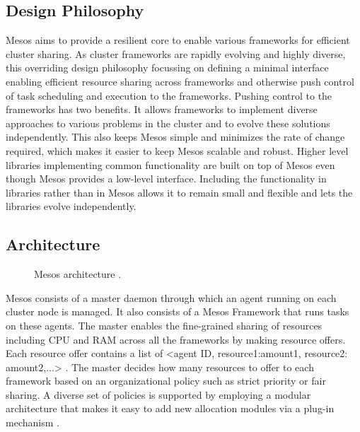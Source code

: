 \documentclass[9pt,twocolumn,twoside]{../../styles/osajnl}
\begin{document}
\subsection{Design Philosophy}
Mesos aims to provide a resilient core to enable various frameworks
for efficient cluster sharing. As cluster frameworks are rapidly
evolving and highly diverse, this overriding design philosophy
focussing on defining a minimal interface enabling efficient
resource sharing across frameworks and otherwise push control of task
scheduling and execution to the frameworks. Pushing control to the
frameworks has two benefits. It allows frameworks to implement diverse
approaches to various problems in the cluster and to evolve these
solutions independently. This also keeps Mesos simple and minimizes
the rate of change required, which makes it easier to keep Mesos
scalable and robust. Higher level libraries implementing common
functionality are built on top of Mesos even though Mesos provides a
low-level interface. Including the functionality in libraries rather
than in Mesos allows it to remain small and flexible and lets the
libraries evolve independently.

\subsection{Architecture}

\begin{figure}[htbp]
\centering
{}
\caption{Mesos architecture \cite{www-mesos-arch}.}
\label{fig:false-color}
\end{figure}

Mesos consists of a master daemon through which an agent running on
each cluster node is managed. It also consists of a Mesos Framework
that runs tasks on these agents.  The master enables the fine-grained
sharing of resources including CPU and RAM across all the frameworks
by making resource offers. Each resource offer contains a list of
<agent ID, resource1:amount1, resource2: amount2,...>
\cite{www-mesos-arch}. The master decides how many resources to offer
to each framework based on an organizational policy such as strict
priority or fair sharing. A diverse set of policies is supported by
employing a modular architecture that makes it easy to add new
allocation modules via a plug-in mechanism \cite{www-mesos}.
\end{document}
